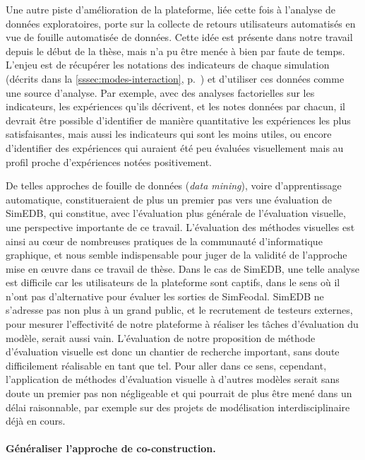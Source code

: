 Une autre piste d'amélioration de la plateforme, liée cette fois à l'analyse de données exploratoires, porte sur la collecte de retours utilisateurs automatisés en vue de fouille automatisée de données.
Cette idée est présente dans notre travail depuis le début de la thèse, mais n'a pu être menée à bien par faute de temps.
L'enjeu est de récupérer les \og notations\fg{} des indicateurs de chaque simulation (décrits dans la \cref{sssec:modes-interaction}, p.~\pageref{par:noter-simul}) et d'utiliser ces données comme une source d'analyse.
Par exemple, avec des analyses factorielles sur les indicateurs, les expériences qu'ils décrivent, et les notes données par chacun, il devrait être possible d'identifier de manière quantitative les expériences les plus satisfaisantes, mais aussi les indicateurs qui sont les moins utiles, ou encore d'identifier des expériences qui auraient été peu évaluées visuellement mais au profil proche d'expériences notées positivement.

De telles approches de \og fouille de données\fg{} (\textit{data mining}), voire d'apprentissage automatique, constitueraient de plus un premier pas vers une évaluation de SimEDB, qui constitue, avec l'évaluation plus générale de l'évaluation visuelle, une perspective importante de ce travail.
L'évaluation des méthodes visuelles est ainsi au cœur de nombreuses pratiques de la communauté d'informatique graphique, et nous semble indispensable pour juger de la validité de l'approche mise en œuvre dans ce travail de thèse.
Dans le cas de SimEDB, une telle analyse est difficile car les utilisateurs de la plateforme sont captifs, dans le sens où il n'ont pas d'alternative pour évaluer les sorties de SimFeodal.
SimEDB ne s'adresse pas non plus à un grand public, et le recrutement de \og testeurs\fg{} externes, pour mesurer l'effectivité de notre plateforme à réaliser les tâches d'évaluation du modèle, serait aussi vain.
L'évaluation de notre proposition de méthode d'évaluation visuelle est donc un chantier de recherche important, sans doute difficilement réalisable en tant que tel.
Pour aller dans ce sens, cependant, l'application de méthodes d'évaluation visuelle à d'autres modèles serait sans doute un premier pas non négligeable et qui pourrait de plus être mené dans un délai raisonnable, par exemple sur des projets de modélisation interdisciplinaire déjà en cours.


\paragraph{Généraliser l'approche de co-construction.}

